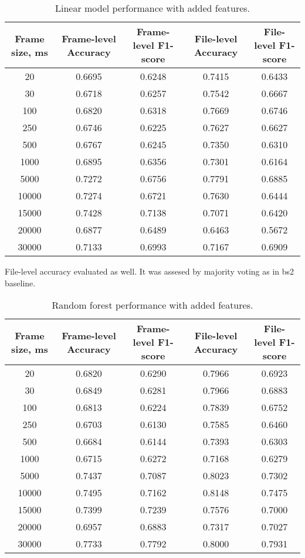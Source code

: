 \documentclass[conference]{IEEEtran}
\begin{document}
\begin{table}[h]
\centering
\caption{Linear model performance with added features.}
\begin{tabular}{|c|c|c|c|c|}
\hline
\textbf{Frame size, ms} & \textbf{Frame-level Accuracy} & \textbf{Frame-level F1-score} & \textbf{File-level Accuracy} & \textbf{File-level F1-score} \\
\hline
20 & 0.6695 & 0.6248 & 0.7415 & 0.6433 \\
\hline
30 & 0.6718 & 0.6257 & 0.7542 & 0.6667 \\
\hline
100 & 0.6820 & 0.6318 & 0.7669 & 0.6746 \\
\hline
250 & 0.6746 & 0.6225 & 0.7627 & 0.6627 \\
\hline
500 & 0.6767 & 0.6245 & 0.7350 & 0.6310 \\
\hline
1000 & 0.6895 & 0.6356 & 0.7301 & 0.6164 \\
\hline
5000 & 0.7272 & 0.6756 & 0.7791 & 0.6885 \\
\hline
10000 & 0.7274 & 0.6721 & 0.7630 & 0.6444 \\
\hline
15000 & 0.7428 & 0.7138 & 0.7071 & 0.6420 \\
\hline
20000 & 0.6877 & 0.6489 & 0.6463 & 0.5672 \\
\hline
30000 & 0.7133 & 0.6993 & 0.7167 & 0.6909 \\
\hline
\end{tabular}
\label{tab:linear_model_added_feat_perf}
\end{table}


File-level accuracy evaluated as well. It was assesed by majority voting as in bs2 baseline.

\begin{table}[h]
\centering
\caption{Random forest performance with added features.}
\begin{tabular}{|c|c|c|c|c|}
\hline
\textbf{Frame size, ms} & \textbf{Frame-level Accuracy} & \textbf{Frame-level F1-score} & \textbf{File-level Accuracy} & \textbf{File-level F1-score} \\
\hline
20 & 0.6820 & 0.6290 & 0.7966 & 0.6923 \\
\hline
30 & 0.6849 & 0.6281 & 0.7966 & 0.6883 \\
\hline
100 & 0.6813 & 0.6224 & 0.7839 & 0.6752 \\
\hline
250 & 0.6703 & 0.6130 & 0.7585 & 0.6460 \\
\hline
500 & 0.6684 & 0.6144 & 0.7393 & 0.6303 \\
\hline
1000 & 0.6715 & 0.6272 & 0.7168 & 0.6279 \\
\hline
5000 & 0.7437 & 0.7087 & 0.8023 & 0.7302 \\
\hline
10000 & 0.7495 & 0.7162 & 0.8148 & 0.7475 \\
\hline
15000 & 0.7399 & 0.7239 & 0.7576 & 0.7000 \\
\hline
20000 & 0.6957 & 0.6883 & 0.7317 & 0.7027 \\
\hline
30000 & 0.7733 & 0.7792 & 0.8000 & 0.7931 \\
\hline
\end{tabular}
\label{tab:random_forest_added_feat_perf}
\end{table}
\end{document}
